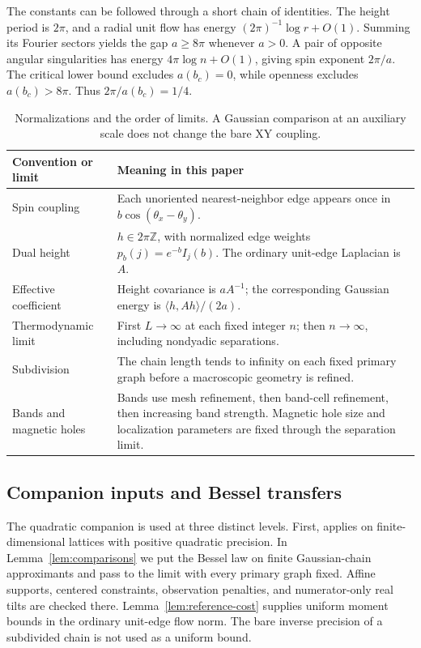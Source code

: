 \documentclass[11pt]{article}
\numberwithin{equation}{section}
\theoremstyle{definition}
\theoremstyle{remark}
\newcommand{\Z}{\mathbb Z}
\newcommand{\ip}[2]{\langle #1,#2\rangle}
\begin{document}
The constants can be followed through a short chain of identities.
The height period is \(2\pi\), and a radial unit flow has energy
\((2\pi)^{-1}\log r+O(1)\). Summing its Fourier sectors yields
the gap \(a\ge8\pi\) whenever \(a>0\). A pair of opposite
angular singularities has energy \(4\pi\log n+O(1)\), giving
spin exponent \(2\pi/a\). The critical lower bound excludes
\(a(b_c)=0\), while openness excludes \(a(b_c)>8\pi\).
Thus \(2\pi/a(b_c)=1/4\).

\begin{table}[htbp]
\centering\small
\begin{tabularx}{\textwidth}{@{}p{}X@{}}
\toprule
Convention or limit & Meaning in this paper\\
\midrule
Spin coupling & Each unoriented nearest-neighbor edge appears once
in \(b\cos(\theta_x-\theta_y)\).\\
Dual height & \(h\in2\pi\Z\), with normalized edge weights
\(p_b(j)=e^{-b}I_j(b)\). The ordinary unit-edge Laplacian is \(A\).\\
Effective coefficient & Height covariance is \(aA^{-1}\);
the corresponding Gaussian energy is \(\ip{h}{Ah}/(2a)\).\\
Thermodynamic limit & First \(L\to\infty\) at each fixed integer
\(n\); then \(n\to\infty\), including nondyadic separations.\\
Subdivision & The chain length tends to infinity on each fixed
primary graph before a macroscopic geometry is refined.\\
Bands and magnetic holes & Bands use mesh refinement, then band-cell
refinement, then increasing band strength. Magnetic hole size and
localization parameters are fixed through the separation limit.\\
\bottomrule
\end{tabularx}
\caption{Normalizations and the order of limits. A Gaussian
comparison at an auxiliary scale does not change the bare XY coupling.}
\label{tab:conventions}
\end{table}

\subsection{Companion inputs and Bessel transfers}\label{sec:interfaces}
The quadratic companion is used at three distinct levels.
First,  applies on finite-dimensional
lattices with positive quadratic precision. In
Lemma~\ref{lem:comparisons} we put the Bessel law on finite
Gaussian-chain approximants and pass to the limit with every
primary graph fixed. Affine supports, centered constraints,
observation penalties, and numerator-only real tilts are checked
there. Lemma~\ref{lem:reference-cost} supplies uniform moment
bounds in the ordinary unit-edge flow norm. The bare inverse
precision of a subdivided chain is not used as a uniform bound.
\end{document}
